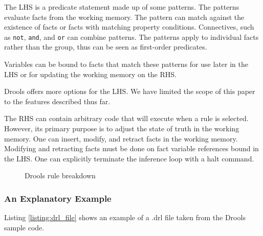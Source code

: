 The LHS is a predicate statement made up of some patterns.
The patterns evaluate facts from the working memory.
The pattern can match against the existence of facts or facts with matching property conditions.
Connectives, such as \texttt{not}, \texttt{and}, and \texttt{or} can combine patterns.
The patterns apply to individual facts rather than the group, thus can be seen as first-order predicates.

Variables can be bound to facts that match these patterns for use later in the LHS or for updating the working memory on the RHS.

Drools offers more options for the LHS.
We have limited the scope of this paper to the features described thus far.

The RHS can contain arbitrary code that will execute when a rule is selected.
However, its primary purpose is to adjust the state of truth in the working memory.
One can insert, modify, and retract facts in the working memory.
Modifying and retracting facts must be done on fact variable references bound in the LHS.
One can explicitly terminate the inference loop with a halt command.

\begin{figure}[h]
    \centering
    \caption{Drools rule breakdown}
    \label{fig:Drools_Rule_Breakdown}
\end{figure}

\subsubsection{An Explanatory Example}
Listing \ref{listing:drl_file} shows an example of a .drl file taken from the Drools sample code.

